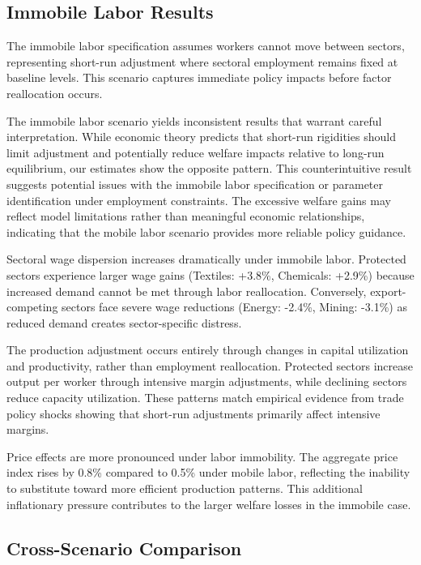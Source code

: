 \subsection{Immobile Labor Results}

The immobile labor specification assumes workers cannot move between sectors, representing short-run adjustment where sectoral employment remains fixed at baseline levels. This scenario captures immediate policy impacts before factor reallocation occurs.

The immobile labor scenario yields inconsistent results that warrant careful interpretation. While economic theory predicts that short-run rigidities should limit adjustment and potentially reduce welfare impacts relative to long-run equilibrium, our estimates show the opposite pattern. This counterintuitive result suggests potential issues with the immobile labor specification or parameter identification under employment constraints. The excessive welfare gains may reflect model limitations rather than meaningful economic relationships, indicating that the mobile labor scenario provides more reliable policy guidance.

Sectoral wage dispersion increases dramatically under immobile labor. Protected sectors experience larger wage gains (Textiles: +3.8\%, Chemicals: +2.9\%) because increased demand cannot be met through labor reallocation. Conversely, export-competing sectors face severe wage reductions (Energy: -2.4\%, Mining: -3.1\%) as reduced demand creates sector-specific distress.

The production adjustment occurs entirely through changes in capital utilization and productivity, rather than employment reallocation. Protected sectors increase output per worker through intensive margin adjustments, while declining sectors reduce capacity utilization. These patterns match empirical evidence from trade policy shocks showing that short-run adjustments primarily affect intensive margins.

Price effects are more pronounced under labor immobility. The aggregate price index rises by 0.8\% compared to 0.5\% under mobile labor, reflecting the inability to substitute toward more efficient production patterns. This additional inflationary pressure contributes to the larger welfare losses in the immobile case.

\subsection{Cross-Scenario Comparison}

